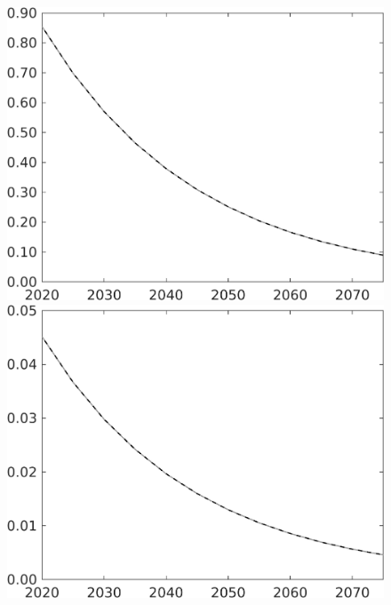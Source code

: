 \documentclass[12pt]{article}
\begin{document}
\begin{figure}[h!!]
\begin{minipage}[]{0.32\textwidth}
	\end{minipage}	
	\begin{minipage}[]{0.32\textwidth}
		\includegraphics[width=1\textwidth]{../../codding_model/own_basedOnFried/optimalPol_010922_revision/figures/all_13Sept22/CompTaul_Equlab_LFBAU_Reg0_pg_spillover0_nsk1_xgr1_knspil1_sep1_countec0_GovRev0_etaa0.79_lgd0.png}
	\end{minipage}		
\begin{minipage}[]{0.32\textwidth}
\includegraphics[width=1\textwidth]{../../codding_model/own_basedOnFried/optimalPol_010922_revision/figures/all_13Sept22/CompTaul_Equlab_LFBAU_Reg0_pepn_spillover0_nsk1_xgr1_knspil1_sep1_countec0_GovRev0_etaa0.79_lgd0.png}

\end{minipage}
\end{figure}
\end{document}
